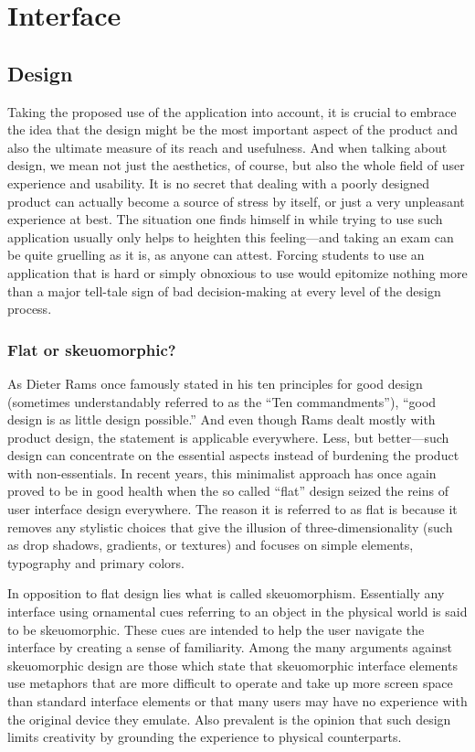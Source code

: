 \documentclass[thesis=M,english,hidelinks]{FITthesis}[2012/10/20]
\begin{document}
\section{Interface}

  \subsection{Design}

Taking the proposed use of the application into account, it is crucial to embrace the idea that the design might be the most important aspect of the product and also the ultimate measure of its reach and usefulness. And when talking about design, we mean not just the aesthetics, of course, but also the whole field of user experience and usability. It is no secret that dealing with a poorly designed product can actually become a source of stress by itself, or just a very unpleasant experience at best. The situation one finds himself in while trying to use such application usually only helps to heighten this feeling---and taking an exam can be quite gruelling as it is, as anyone can attest. Forcing students to use an application that is hard or simply obnoxious to use would epitomize nothing more than a major tell-tale sign of bad decision-making at every level of the design process.

    \subsubsection{Flat or skeuomorphic?}

As Dieter Rams once famously stated in his ten principles for good design (sometimes understandably referred to as the ``Ten commandments''), ``good design is as little design possible.'' And even though Rams dealt mostly with product design, the statement is applicable everywhere. Less, but better---such design can concentrate on the essential aspects instead of burdening the product with non-essentials. In recent years, this minimalist approach has once again proved to be in good health when the so called ``flat'' design seized the reins of user interface design everywhere. The reason it is referred to as flat is because it removes any stylistic choices that give the illusion of three-dimensionality (such as drop shadows, gradients, or textures) and focuses on simple elements, typography and primary colors.

In opposition to flat design lies what is called skeuomorphism. Essentially any interface using ornamental cues referring to an object in the physical world is said to be skeuomorphic. These cues are intended to help the user navigate the interface by creating a sense of familiarity. Among the many arguments against skeuomorphic design are those which state that skeuomorphic interface elements use metaphors that are more difficult to operate and take up more screen space than standard interface elements or that many users may have no experience with the original device they emulate. Also prevalent is the opinion that such design limits creativity by grounding the experience to physical counterparts.
\end{document}
